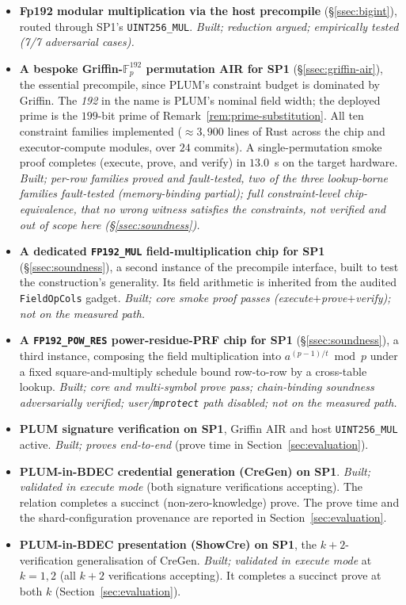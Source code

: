 \begin{itemize}
  \item \textbf{Fp192 modular multiplication via the host precompile}
  (\S\ref{ssec:bigint}), routed through SP1's \texttt{UINT256\_MUL}. \emph{Built; reduction argued; empirically tested (7/7 adversarial cases).}
  \item \textbf{A bespoke Griffin-$\mathbb{F}_p^{192}$ permutation AIR for SP1} (\S\ref{ssec:griffin-air}), the essential precompile, since PLUM's constraint budget is dominated by Griffin. The \emph{192} in the name is PLUM's nominal field width; the deployed prime is the $199$-bit prime of Remark~\ref{rem:prime-substitution}. All ten constraint families implemented ($\approx 3{,}900$ lines of Rust across the chip and executor-compute modules, over $24$ commits). A single-permutation smoke proof completes (execute, prove, and verify) in $13.0$~s on the target hardware.
  \emph{Built; per-row families proved and fault-tested, two of the three lookup-borne families fault-tested (memory-binding partial); full constraint-level chip-equivalence, that no wrong witness satisfies the constraints, not verified and out of scope here (\S\ref{ssec:soundness}).}
  \item \textbf{A dedicated \texttt{FP192\_MUL} field-multiplication chip for SP1} (\S\ref{ssec:soundness}), a second instance of the precompile interface, built to test the construction's generality. Its field arithmetic is inherited from the audited \texttt{FieldOpCols} gadget. \emph{Built; core smoke proof passes (execute$+$prove$+$verify); not on the measured path.}
  \item \textbf{A \texttt{FP192\_POW\_RES} power-residue-PRF chip for SP1} (\S\ref{ssec:soundness}), a third instance, composing the field multiplication into $a^{(p-1)/t}\bmod p$ under a fixed square-and-multiply schedule bound row-to-row by a cross-table lookup. \emph{Built; core and multi-symbol prove pass; chain-binding soundness adversarially verified; user/\texttt{mprotect} path disabled; not on the measured path.}
  \item \textbf{PLUM signature verification on SP1}, Griffin AIR and host \texttt{UINT256\_MUL} active. \emph{Built; proves end-to-end} (prove time in Section~\ref{sec:evaluation}).
  \item \textbf{PLUM-in-BDEC credential generation (CreGen) on SP1}. \emph{Built; validated in execute mode} (both signature verifications accepting). The relation completes a succinct (non-zero-knowledge) prove. The prove time and the shard-configuration provenance are reported in Section~\ref{sec:evaluation}.
  \item \textbf{PLUM-in-BDEC presentation (ShowCre) on SP1}, the $k+2$-verification generalisation of CreGen. \emph{Built; validated in execute mode} at $k=1,2$ (all $k+2$ verifications accepting). It completes a succinct prove at both $k$ (Section~\ref{sec:evaluation}).
\end{itemize}

